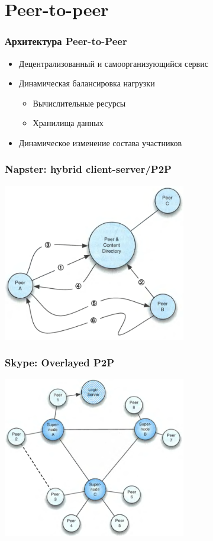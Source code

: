 \documentclass[xetex,mathserif,serif]{beamer}
\begin{document}
    \section{Peer-to-peer}

    \begin{frame}
        \frametitle{Архитектура Peer-to-Peer}
        \begin{itemize}
            \item Децентрализованный и самоорганизующийся сервис
            \item Динамическая балансировка нагрузки
            \begin{itemize}
                \item Вычислительные ресурсы
                \item Хранилища данных
            \end{itemize}
            \item Динамическое изменение состава участников
        \end{itemize}
    \end{frame}

    \begin{frame}
        \frametitle{Napster: hybrid client-server/P2P}
        \begin{center}
            \includegraphics[width=0.6\textwidth]{napster.png}
        \end{center}
    \end{frame}

    \begin{frame}
        \frametitle{Skype: Overlayed P2P}
        \begin{center}
            \includegraphics[width=0.6\textwidth]{skype.png}
        \end{center}
    \end{frame}
\end{document}
